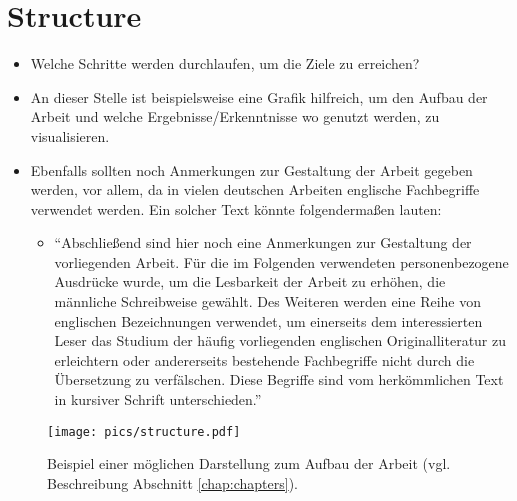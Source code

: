 \section{Structure}
\begin{itemize}
	\item Welche Schritte werden durchlaufen, um die Ziele zu erreichen?
	\item An dieser Stelle ist beispielsweise eine Grafik hilfreich, um den Aufbau der Arbeit und welche Ergebnisse/Erkenntnisse wo genutzt werden, zu visualisieren.
	\item Ebenfalls sollten noch Anmerkungen zur Gestaltung der Arbeit gegeben werden, vor allem, da in vielen deutschen Arbeiten englische Fachbegriffe verwendet werden. Ein solcher Text könnte folgendermaßen lauten:
		\begin{itemize}
			\item ``Abschließend sind hier noch eine Anmerkungen zur Gestaltung der vorliegenden Arbeit. Für die im Folgenden verwendeten personenbezogene Ausdrücke wurde, um die Lesbarkeit der Arbeit zu erhöhen, die männliche Schreibweise gewählt. Des Weiteren werden eine Reihe von englischen Bezeichnungen verwendet, um einerseits dem interessierten Leser das Studium der häufig vorliegenden englischen Originalliteratur zu erleichtern oder andererseits bestehende Fachbegriffe nicht durch die Übersetzung zu verfälschen. Diese Begriffe sind vom herkömmlichen Text in kursiver Schrift unterschieden.''
		\end{itemize}
\end{itemize}

\begin{figure}[!ht]
	\centering
		\texttt{[image: pics/structure.pdf]}
	\caption[Beispiel einer möglichen Darstellung zum Aufbau der Arbeit]{Beispiel einer möglichen Darstellung zum Aufbau der Arbeit (vgl. Beschreibung Abschnitt  \ref{chap:chapters}).}
	\label{fig:structurethesis}
\end{figure}
